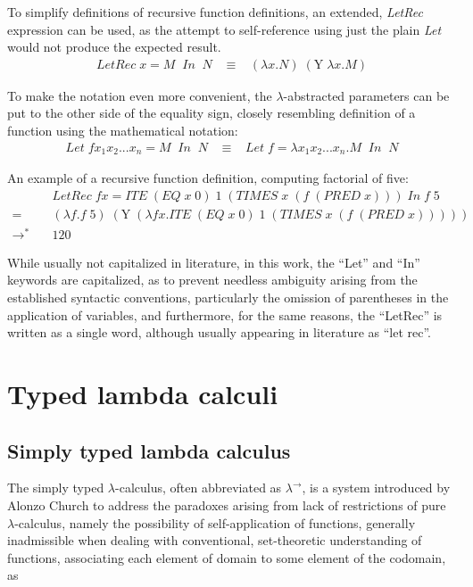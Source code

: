 \documentclass[table, a4paper, 10pt]{book}
\begin{document}
\noindent
To simplify definitions of recursive function definitions, an extended,
\textit{LetRec} expression can be used, as the attempt to self-reference
using just the plain \textit{Let} would not produce the expected result.
\begin{align*}
\mathit{LetRec}\;x = M\;\;\mathit{In}\;\;N \;\;\;\equiv\;\;\;(\lambda x.N)\;(\mathrm{Y}\;\lambda x.M)
\end{align*}

\noindent
To make the notation even more convenient, the $\lambda$-abstracted parameters can be put
to the other side of the equality sign, closely resembling 
definition of a function using the mathematical notation:
\begin{align*}
\mathit{Let}\;f x_1 x_2 ... x_n = M\;\;\mathit{In}\;\;N \;\;\;\equiv\;\;\;\mathit{Let}\;f = \lambda x_1 x_2 ... x_n.M\;\;\mathit{In}\;\;N
\end{align*}

\noindent
An example of a recursive function definition, computing factorial of five:
\begin{align*}
&\mathit{Let Rec}\;f x = \mathit{ITE}\;(\mathit{EQ}\;x\;\mathit{0})\;\mathit{1}\;(\mathit{TIMES}\;x\;(f\;(\mathit{PRED}\;x)))\;\mathit{In}\;f\;\mathit{5}\\
=\;\;\quad&(\lambda f.f\;\mathit{5})\;(\mathrm{Y}\;(\lambda fx.\mathit{ITE}\;(\mathit{EQ}\;x\;\mathit{0})\;\mathit{1}\;(\mathit{TIMES}\;x\;(f\;(\mathit{PRED}\;x)))))\\
\to^\ast\quad&\mathit{120}
\end{align*}

\noindent
While usually not capitalized in literature,
in this work, the ``Let'' and ``In'' keywords are capitalized,
as to prevent needless ambiguity arising
from the established syntactic conventions, particularly the omission
of parentheses in the application of variables, and furthermore,
for the same reasons, the ``LetRec'' is written as a single word,
although usually appearing in literature as ``let rec''.

\section{Typed lambda calculi} \label{sec:types}

\subsection{Simply typed lambda calculus}
The simply typed $\lambda$-calculus, often abbreviated as $\lambda^\to$, is a system
introduced by Alonzo Church to address the paradoxes arising from lack of restrictions of pure $\lambda$-calculus,
namely the possibility of self-application of functions, generally inadmissible
when dealing with conventional, set-theoretic understanding of functions, associating
each element of domain to some element of the codomain, as
\end{document}
